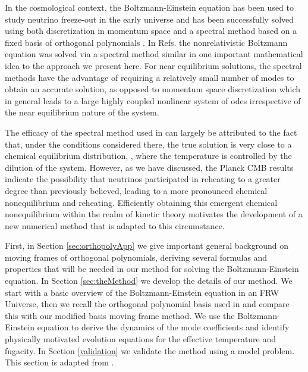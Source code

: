 In the cosmological context, the Boltzmann-Einstein equation has been used to study neutrino freeze-out in the early universe and has been successfully solved using both discretization in momentum space \cite{Hannestad:1995rs,Dolgov:1997mb,Dolgov:1998sf,Gnedin:1997vn,Mangano:2005cc} and a spectral method based on a fixed basis of orthogonal polynomials \cite{Esposito:2000hi,Mangano:2001iu}.    In Refs.\cite{Wilkening,Wilkening2} the nonrelativistic Boltzmann equation was solved via a spectral method similar in  one important mathematical idea to the approach we present here.  For near equilibrium solutions, the spectral methods have the advantage of requiring a relatively small number of modes to obtain an accurate solution, as opposed to momentum space discretization which in general leads to a large highly coupled nonlinear system of odes irrespective of the near equilibrium nature of the system.  

The efficacy of the spectral method used in \cite{Esposito:2000hi,Mangano:2001iu} can largely be attributed to the fact that, under the conditions considered there, the true solution is very close to a chemical equilibrium distribution, , where the temperature is controlled by the dilution of the system. However, as we have discussed, the Planck CMB results \cite{Planck:2013pxb} indicate the possibility that neutrinos participated in reheating to a greater degree than previously believed, leading to a more pronounced chemical nonequilibrium and reheating. Efficiently obtaining this emergent chemical nonequilibrium within the realm of kinetic theory motivates the development of a new numerical method that is adapted to this  circumstance.

 First, in  Section \ref{sec:orthopolyApp}  we give important general background on moving frames of orthogonal polynomials, deriving several formulas and properties that will be needed in our method for solving the Boltzmann-Einstein equation. In Section \ref{sec:theMethod} we develop the details of our method. We start with a basic overview of the Boltzmann-Einstein equation in an FRW Universe, then we recall the orthogonal polynomial basis used in \cite{Esposito:2000hi,Mangano:2001iu} and compare this with our modified basis moving frame method.  We use the Boltzmann-Einstein equation to derive the dynamics of the mode coefficients and identify physically motivated evolution equations for the effective temperature and fugacity.  In Section \ref{validation} we validate the method using a model problem.   This section is adapted from \cite{Birrell:2014ona,Birrell:2014gea,Birrell:2014uka}.






